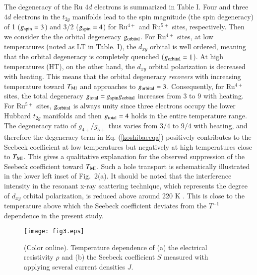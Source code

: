 \documentclass[aps,twocolumn,showpacs,preprintnumbers,amsmath,amssymb,floats,citeautoscript,nobalancelastpage]{revtex4-1}
\begin{document}
The degeneracy of the Ru $4d$ electrons is
summarized in Table I.
Four and three $4d$ electrons in the $t_{2g}$ manifolds 
lead to the spin magnitude (the spin degeneracy) of 1 ($g_{\rm spin}=3$) and 3/2 ($g_{\rm spin}=4$)
for Ru$^{4+}$ and Ru$^{5+}$ sites, respectively.
Then we consider the the orbital degeneracy $g_{\rm orbital}$.
For Ru$^{4+}$ sites, at low temperatures (noted as LT in Table. I), 
the $d_{xy}$ orbital is well ordered, 
meaning that the orbital degeneracy is completely quenched ($g_{\rm orbital} = 1$).
At high temperatures (HT), on the other hand, the $d_{xy}$ orbital polarization is 
decreased with heating.
This means that the orbital degeneracy {\it recovers} with increasing temperature toward $T_{\rm MI}$
and approaches to $g_{\rm orbital} = 3$.
Consequently, for Ru$^{4+}$ sites, the total degeneracy $g_{\rm total}=g_{\rm spin}g_{\rm orbital}$
increases from 3 to 9 with heating.
For Ru$^{5+}$ sites, $g_{\rm orbital}$ is always unity
since three electrons occupy the lower Hubbard $t_{2g}$ manifolds \cite{Anisimov2002} and
then $g_{\rm total} = 4$ holds in the entire temperature range.
The degeneracy ratio of $g_{4+}/g_{5+}$ thus varies
from $3/4$ to $9/4$ with heating, and
therefore the degeneracy term in Eq. (\ref{koshibaeeqa}) 
positively contributes to the Seebeck coefficient at low temperatures but 
negatively at high temperatures close to $T_{\rm MI}$.
This gives a qualitative explanation for the observed suppression of the Seebeck coefficient 
toward $T_{\rm MI}$.
Such a hole transport is schematically illustrated in the lower left inset of Fig.~2(a).
It should be noted that 
the interference intensity in the resonant x-ray scattering technique,
which represents the degree of $d_{xy}$ orbital polarization,
is reduced above around 220 K \cite{Kubota2005}.
This is close to the temperature above which the Seebeck coefficient 
deviates from the $T^{-1}$ dependence in the present study.



\begin{figure}[b]
\begin{center}
\texttt{[image: fig3.eps]}
\caption{(Color online).
Temperature dependence of (a) the electrical resistivity $\rho$ 
and (b) the Seebeck coefficient $S$ measured with applying several current densities $J$. 
}
\end{center}
\end{figure}
\end{document}
